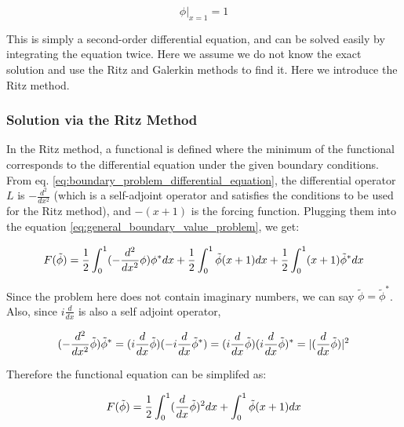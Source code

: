 \documentclass[a4paper,12pt]{report}
\begin{document}
\begin{equation}
  \left.\phi\right|_{x=1}=1
\end{equation}

This is simply a second-order differential equation,
and can be solved easily by integrating the equation twice.
Here we assume we do not know the exact solution
and use the Ritz and Galerkin methods to find it.
Here we introduce the Ritz method.

\subsubsection{Solution via the Ritz Method}

In the Ritz method,
a functional is defined where the minimum of the functional
corresponds to the differential equation under the given boundary conditions.
From eq. \ref{eq:boundary_problem_differential_equation},
the differential operator $L$ is $-\frac{d^2}{dx^2}$ (which is
a self-adjoint operator and satisfies the conditions to be used for the Ritz method),
and $-(x+1)$ is the forcing function.
Plugging them into the equation \ref{eq:general_boundary_value_problem},
we get:

\begin{equation}
  F(\tilde{\phi}) = \frac{1}{2}\int_{0}^1 (-\frac{d^2}{dx^2}\phi) \phi^* dx \\
  + \frac{1}{2}\int_{0}^1 \tilde{\phi}(x + 1) dx \\
  + \frac{1}{2}\int_{0}^1 (x + 1)\tilde{\phi}^* dx
\end{equation}

Since the problem here does not contain imaginary numbers,
we can say $\tilde{\phi} = \tilde{\phi}^*$.
Also, since $i\frac{d}{dx}$ is also a self adjoint operator,

\begin{equation}
  (-\frac{d^2}{dx^2}\tilde{\phi}) \tilde{\phi}^* = \\
  (i\frac{d}{dx}\tilde{\phi})(-i\frac{d}{dx}\tilde{\phi}^*) \\
  = (i\frac{d}{dx}\tilde{\phi})(i\frac{d}{dx}\tilde{\phi})^* \\
  = |(\frac{d}{dx}\tilde{\phi})|^2
\end{equation}

Therefore the functional equation can be simplifed as:

\begin{equation} \label{eq:ritz_functional}
  F(\tilde{\phi}) = \frac{1}{2}\int_{0}^1 (\frac{d}{dx}\tilde{\phi})^2 dx \\
  + \int_{0}^1 \tilde{\phi}(x + 1) dx
\end{equation}
\end{document}
